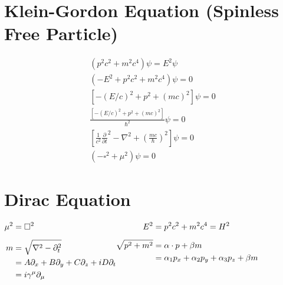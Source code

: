 \documentclass[12pt]{article}
\begin{document}
\vspace{20pt}
\section{Klein-Gordon Equation (Spinless Free Particle)}

\begin{gather*}
    (p^2c^2 +m^2c^4)\psi = E^2 \psi\\[5pt]
    (-E^2 + p^2c^2 + m^2c^4)\psi = 0\\[5pt]
    \left[ - (E/c)^2 + p^2 + (mc)^2 \right] \psi = 0\\[5pt]
    \frac{\left[ - (E/c)^2 + p^2 + (mc)^2 \right]}{\hbar^2} \psi = 0\\[5pt]
    \left[ \frac{1}{c^2} \frac{\partial}{\partial t}^2 - \nabla^2 
        + \left( \frac{mc}{\hbar} \right)^2 \right] \psi = 0\\[5pt]
    \boxed{ (- \square^2 + \mu^2) \psi = 0 }
\end{gather*}

\newpage
\section{Dirac Equation}

\noindent
\(
    \hfill
    \begin{aligned}[t]
        \mu^2 & = \square^2
            \\[5pt]
        m & = \sqrt{\nabla^2 - \partial_t^2} \\
        & = A \partial_x + B \partial_y + C \partial_z + i D \partial_t \\
        & = i \gamma^\mu \partial_\mu
    \end{aligned}
    \hfill
    \begin{aligned}[t]
        E^2 & = p^2 c^2 + m^2 c^4 = H^2
            \\[5pt]
        \sqrt{p^2 + m^2} & = \alpha \cdot p + \beta m\\
        & = \alpha_1 p_x + \alpha_2 p_y + \alpha_3 p_z + \beta m
    \end{aligned}
    \hfill
\)
\end{document}
